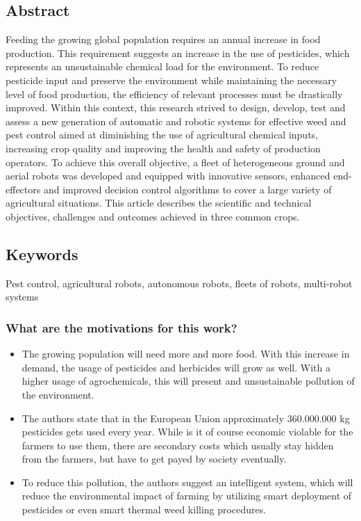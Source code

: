     \subsection*{Abstract}
    Feeding the growing global population requires an annual increase in food
    production. This requirement suggests an increase in the use of pesticides, which represents
    an unsustainable chemical load for the environment. To reduce pesticide input and preserve the environment while maintaining the necessary level of food production, the
    efficiency of relevant processes must be drastically improved. Within this context, this
    research strived to design, develop, test and assess a new generation of automatic and
    robotic systems for effective weed and pest control aimed at diminishing the use of
    agricultural chemical inputs, increasing crop quality and improving the health and safety of
    production operators. To achieve this overall objective, a fleet of heterogeneous ground
    and aerial robots was developed and equipped with innovative sensors, enhanced end-effectors and improved decision control algorithms to cover a large variety of agricultural
    situations. This article describes the scientific and technical objectives, challenges and
    outcomes achieved in three common crops.
    
    \subsection*{Keywords}
    Pest control, agricultural robots, autonomous robots, fleets of robots, multi-robot systems
    
    
     
    \subsubsection*{What are the motivations for this work?}
    \begin{itemize}
        \item The growing population will need more and more food. With this increase in demand, the usage of pesticides and herbicides will grow as well. With a higher usage of agrochemicals, this will present and unsustainable pollution of the environment.
        \item The authors state that in the European Union approximately 360.000.000 kg pesticides gets used every year. While is it of course economic violable for the farmers to use them, there are secondary costs which usually stay hidden from the farmers, but have to get payed by society eventually.
        \item To reduce this pollution, the authors suggest an intelligent system, which will reduce the environmental impact of farming by utilizing smart deployment of pesticides or even smart thermal weed killing procedures.
    \end{itemize}
